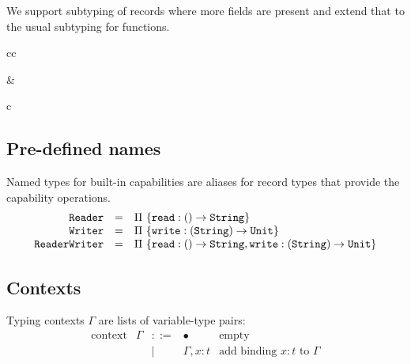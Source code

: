 \documentclass[11pt]{article}
\newcommand{\kw}[1]{\mathtt{#1}}
\begin{document}
We support subtyping of records where more fields are present and extend that to the usual subtyping for functions.

\begin{rules}{cc}


&


\end{rules}

\begin{rules}{c}


\end{rules}

\subsection{Pre-defined names}

Named types for built-in capabilities are aliases for record types that provide the capability operations.
\[
\begin{array}{rcl}
\kw{Reader} & = &
\recty{\{ \kw{read} :\funty{}{\strty} \}} \\

\kw{Writer} & = &
\recty{\{ \kw{write} :\funty{\strty}{\unity} \}} \\

\kw{ReaderWriter} & = &
\recty{\{ \kw{read} :\funty{}{\strty}, \kw{write} :\funty{\strty}{\unity} \}}
\end{array}
\]

\subsection{Contexts}

\newcommand{\bnd}[2]{#1 : #2}
\newcommand{\bnds}[2]{\repo{#1 : #2}}
\newcommand{\nilc}{\bullet}
\newcommand{\consc}[2]{#1,#2}

Typing contexts $\Gamma$ are lists of variable-type pairs:
\[
\begin{array}{rlcll}
\text{context}
  & \Gamma & ::= & \nilc                      & \text{empty} \\
  &        & |   & \consc{\Gamma}{\bnd{x}{t}} & \text{add binding $x:t$ to $\Gamma$} \\
\end{array}
\]
\end{document}
